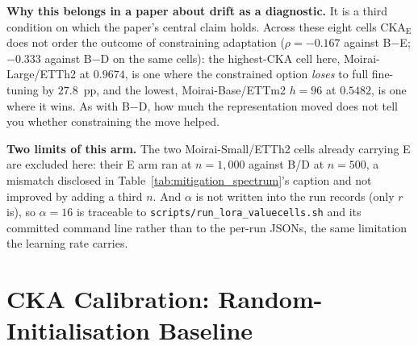 \textbf{Why this belongs in a paper about drift as a diagnostic.} It is a third
condition on which the paper's central claim holds. Across these eight cells
CKA$_\text{E}$ does not order the outcome of constraining adaptation
($\rho{=}{-}0.167$ against B$-$E; ${-}0.333$ against B$-$D on the same cells):
the highest-CKA cell here, Moirai-Large/ETTh2 at $0.9674$, is one where the
constrained option \emph{loses} to full fine-tuning by $27.8$~pp, and the
lowest, Moirai-Base/ETTm2 $h{=}96$ at $0.5482$, is one where it wins. As with
B$-$D, how much the representation moved does not tell you whether constraining
the move helped.

\textbf{Two limits of this arm.} The two Moirai-Small/ETTh2 cells already
carrying E are excluded here: their E arm ran at $n{=}1{,}000$ against B/D at
$n{=}500$, a mismatch disclosed in Table~\ref{tab:mitigation_spectrum}'s caption
and not improved by adding a third $n$. And $\alpha$ is not written into the run
records (only $r$ is), so $\alpha{=}16$ is traceable to
\texttt{scripts/run\_lora\_valuecells.sh} and its committed command line rather
than to the per-run JSONs, the same limitation the learning rate carries.

\begin{table}[!htbp]
\centering
\caption{\textbf{Condition E (LoRA, $r{=}8$, $\alpha{=}16$) on the eight Moirai
value-cells that lacked it.} All contrasts are held-out test MSE, normalised by
the cell's zero-shot test MSE, in percentage points; $\pm$ is SEM over the seeds
in the Seeds column. Sign convention matches B$-$D and B$-$H throughout:
\textbf{positive means full fine-tuning did worse than the comparison arm}. B$-$D
is recomputed on E's seeds, so it is comparable to B$-$E within a row and may
differ from the same cell's row in Table~\ref{tab:heldout_all}, which averages
that cell's full seed set. Parenthesised counts are the seeds sharing the mean's
sign. $\ell_2$ weight drift is exactly $0.0$ for every run and is not shown:
LoRA leaves the base parameters untouched by construction, which is why CKA, not
drift, is the representation measure here. Rows ordered by D$-$E.}
\label{tab:lora_valuecells}

\end{table}

\section{CKA Calibration: Random-Initialisation Baseline}
\label{app:cka_calibration}


